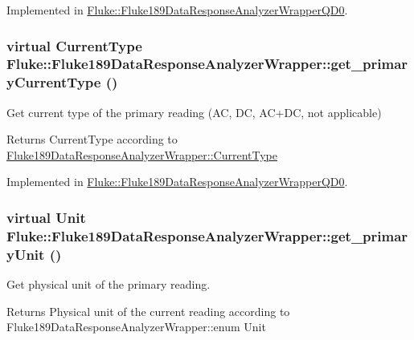 Implemented in \hyperlink{classFluke_1_1Fluke189DataResponseAnalyzerWrapperQD0_a92b0a7a3c0cfd671f86df8e8b61aebb8}{Fluke::Fluke189DataResponseAnalyzerWrapperQD0}.\hypertarget{classFluke_1_1Fluke189DataResponseAnalyzerWrapper_afb7361d6963bb0edd9194ba72a1583df}{
\subsubsection[{get\_\-primaryCurrentType}]{\setlength{\rightskip}{0pt plus 5cm}virtual {\bf CurrentType} Fluke::Fluke189DataResponseAnalyzerWrapper::get\_\-primaryCurrentType ()}}
\label{classFluke_1_1Fluke189DataResponseAnalyzerWrapper_afb7361d6963bb0edd9194ba72a1583df}
Get current type of the primary reading (AC, DC, AC+DC, not applicable) \begin{DoxyReturn}{Returns}
CurrentType according to \hyperlink{classFluke_1_1Fluke189DataResponseAnalyzerWrapper_afef24496da239e3613c40ad3582d7adc}{Fluke189DataResponseAnalyzerWrapper::CurrentType} 
\end{DoxyReturn}


Implemented in \hyperlink{classFluke_1_1Fluke189DataResponseAnalyzerWrapperQD0_acffb9af55e2d690060ef210977c3c933}{Fluke::Fluke189DataResponseAnalyzerWrapperQD0}.\hypertarget{classFluke_1_1Fluke189DataResponseAnalyzerWrapper_a81fd0f497095dba37f2a614bd35426db}{
\subsubsection[{get\_\-primaryUnit}]{\setlength{\rightskip}{0pt plus 5cm}virtual {\bf Unit} Fluke::Fluke189DataResponseAnalyzerWrapper::get\_\-primaryUnit ()}}
\label{classFluke_1_1Fluke189DataResponseAnalyzerWrapper_a81fd0f497095dba37f2a614bd35426db}
Get physical unit of the primary reading. \begin{DoxyReturn}{Returns}
Physical unit of the current reading according to Fluke189DataResponseAnalyzerWrapper::enum Unit 
\end{DoxyReturn}


